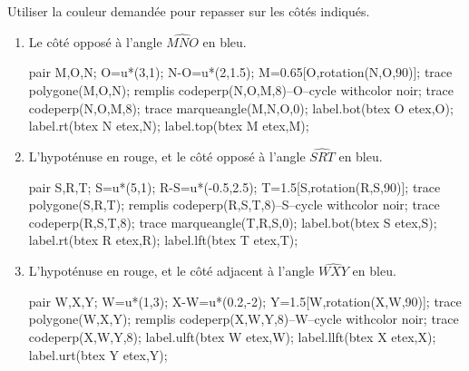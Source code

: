 \begin{exercice*}
    Utiliser la couleur demandée pour repasser sur les côtés indiqués.
    \begin{enumerate}
        \item Le côté opposé à l'angle $\widehat{MNO}$ en bleu.
        
        \medskip        
        \begin{Geometrie}[CoinHD={(6u,4.5u)}]        
            pair M,O,N;
            O=u*(3,1);
            N-O=u*(2,1.5);
            M=0.65[O,rotation(N,O,90)];
            trace polygone(M,O,N);
            remplis codeperp(N,O,M,8)--O--cycle withcolor noir;
            trace codeperp(N,O,M,8);        
            trace marqueangle(M,N,O,0);
            label.bot(btex O etex,O);
            label.rt(btex N etex,N);
            label.top(btex M etex,M);
        \end{Geometrie}
        \item L'hypoténuse en rouge, et le côté opposé à l'angle $\widehat{SRT}$ en bleu.
        
        \medskip        
        \begin{Geometrie}[CoinHD={(6u,4.5u)}]        
            pair S,R,T;
            S=u*(5,1);
            R-S=u*(-0.5,2.5);
            T=1.5[S,rotation(R,S,90)];
            trace polygone(S,R,T);
            remplis codeperp(R,S,T,8)--S--cycle withcolor noir;
            trace codeperp(R,S,T,8);        
            trace marqueangle(T,R,S,0);
            label.bot(btex S etex,S);
            label.rt(btex R etex,R);
            label.lft(btex T etex,T);
        \end{Geometrie}
        \item L'hypoténuse en rouge, et le côté adjacent à l'angle $\widehat{WXY}$ en bleu.
        
        \medskip        
        \begin{Geometrie}[CoinHD={(6u,4.5u)}]        
            pair W,X,Y;
            W=u*(1,3);
            X-W=u*(0.2,-2);
            Y=1.5[W,rotation(X,W,90)];
            trace polygone(W,X,Y);
            remplis codeperp(X,W,Y,8)--W--cycle withcolor noir;
            trace codeperp(X,W,Y,8);
            label.ulft(btex W etex,W);
            label.llft(btex X etex,X);
            label.urt(btex Y etex,Y);
        \end{Geometrie}
    \end{enumerate}
\end{exercice*}
